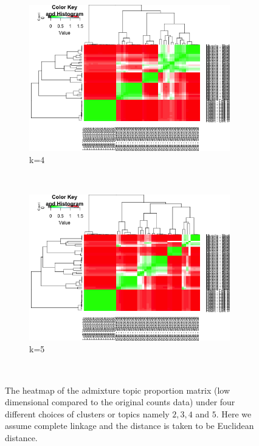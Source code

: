 \begin{figure}[ht]
     \begin{subfigure}[t]{0.5\textwidth}
        \centering
        \includegraphics[height=2.5in]{../plots/hierarchical_admix_4.png}
        \caption{k=4}
    \end{subfigure}%
    ~
    \begin{subfigure}[t]{0.5\textwidth}
        \centering
        \includegraphics[height=2.5in]{../plots/hierarchical_admix_5.png}
        \caption{k=5}
    \end{subfigure}\\

 \caption{The heatmap of the admixture topic proportion matrix (low dimensional compared to the original counts data) under four different choices of clusters or topics namely $2,3,4$ and $5$. Here we assume complete linkage and the distance is taken to be Euclidean distance.}
\end{figure}

